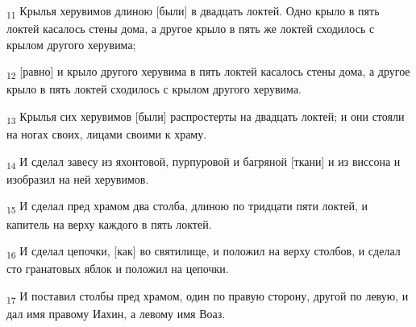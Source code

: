 \begin{tcolorbox}
\textsubscript{11} Крылья херувимов длиною [были] в двадцать локтей. Одно крыло в пять локтей касалось стены дома, а другое крыло в пять же локтей сходилось с крылом другого херувима;
\end{tcolorbox}
\begin{tcolorbox}
\textsubscript{12} [равно] и крыло другого херувима в пять локтей касалось стены дома, а другое крыло в пять локтей сходилось с крылом другого херувима.
\end{tcolorbox}
\begin{tcolorbox}
\textsubscript{13} Крылья сих херувимов [были] распростерты на двадцать локтей; и они стояли на ногах своих, лицами своими к храму.
\end{tcolorbox}
\begin{tcolorbox}
\textsubscript{14} И сделал завесу из яхонтовой, пурпуровой и багряной [ткани] и из виссона и изобразил на ней херувимов.
\end{tcolorbox}
\begin{tcolorbox}
\textsubscript{15} И сделал пред храмом два столба, длиною по тридцати пяти локтей, и капитель на верху каждого в пять локтей.
\end{tcolorbox}
\begin{tcolorbox}
\textsubscript{16} И сделал цепочки, [как] во святилище, и положил на верху столбов, и сделал сто гранатовых яблок и положил на цепочки.
\end{tcolorbox}
\begin{tcolorbox}
\textsubscript{17} И поставил столбы пред храмом, один по правую сторону, другой по левую, и дал имя правому Иахин, а левому имя Воаз.
\end{tcolorbox}

